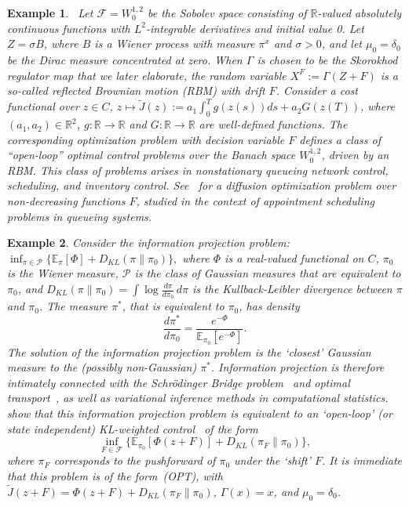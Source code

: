 \documentclass[11pt,leqno]{amsart}
\newtheorem{example}{Example}
\begin{document}
\begin{example}~\label{ex:rbm-opt} Let $\mathcal F = W_0^{1,2}$ be the Sobolev space consisting of $\mathbb R$-valued absolutely continuous functions with $L^2$-integrable derivatives and initial value 0. Let $Z = \sigma B$, where $B$ is a Wiener process with measure $\pi^x$ and $\sigma > 0$, and let $\mu_0 = \delta_0$ be the Dirac measure concentrated at zero.
When $\Gamma$ is chosen to be the Skorokhod regulator map that we later elaborate, the random variable $X^F := \Gamma(Z+F)$ is a so-called {\it reflected Brownian motion} (RBM) with drift $F$. Consider a cost functional over $z \in C$, $z \mapsto \tilde{J}(z):= a_1 \int_0^T g(z(s)) ds + a_2 G(z(T))$, where $(a_1,a_2) \in \mathbb R^2$, $g:\mathbb R \to \mathbb R$ and $G : \mathbb R \to \mathbb R$ are well-defined functions. The corresponding optimization problem with decision variable $F$ defines a class of {``open-loop''} optimal control problems over the Banach space $W_0^{1,2}$, driven by an RBM. This class of problems arises in nonstationary queueing network control, scheduling, and inventory control. See~\cite{armony-atar-honnappa} for a diffusion optimization problem over non-decreasing functions $F$, studied in the context of appointment scheduling problems in queueing systems. 
\end{example}

\begin{example} Consider the \emph{information projection} problem:
    $\inf_{\pi \in \mathcal P} \big\{ \mathbb{E}_{\pi}[\Phi] + D_{KL}(\pi\|\pi_0)\big\},$
    where $\Phi$ is a real-valued functional on $C$, $\pi_0$ is the Wiener measure, $\mathcal{P}$ is the class of Gaussian measures that are equivalent to $\pi_0$, and $D_{KL}(\pi\|\pi_0) = \int \log \frac{d \pi}{d \pi_0} \, d\pi$ is the Kullback-Leibler divergence between $\pi$ and $\pi_0$. The measure $\pi^*$, that is equivalent to $\pi_0$, has density \[\frac{d \pi^*}{d \pi_0} = \frac{e^{-\Phi}}{\mathbb E_{\pi_0}[e^{-\Phi}]}.\] The solution of the information projection problem is the `closest' Gaussian measure to the (possibly non-Gaussian) $\pi^*$.
    Information projection is therefore intimately connected with the Schr\"odinger Bridge problem~\citep{leonard2014survey} and optimal transport~\citep{villani2009optimal}, as well as variational inference methods in computational statistics. \citet[Theorem 1.1]{selk2021information} show that this information projection problem  is equivalent to an `open-loop' (or state independent) KL-weighted control~\citep{bierkens2014explicit} of the form
    \[\inf_{F \in \mathcal{F}} \{\mathbb E_{\pi_0}[\Phi(z + F)] + D_{KL}(\pi_F \|\pi_0)\},\] where $\pi_F$ corresponds to the pushforward of $\pi_0$ under the `shift' $F$. It is immediate that this problem is of the form~(OPT), with $\tilde J(z+F) = \Phi(z+F) + D_{KL}(\pi_F\|\pi_0)$, $\Gamma(x) = x$, and $\mu_0 = \delta_{0}$.
\end{example}
\end{document}
